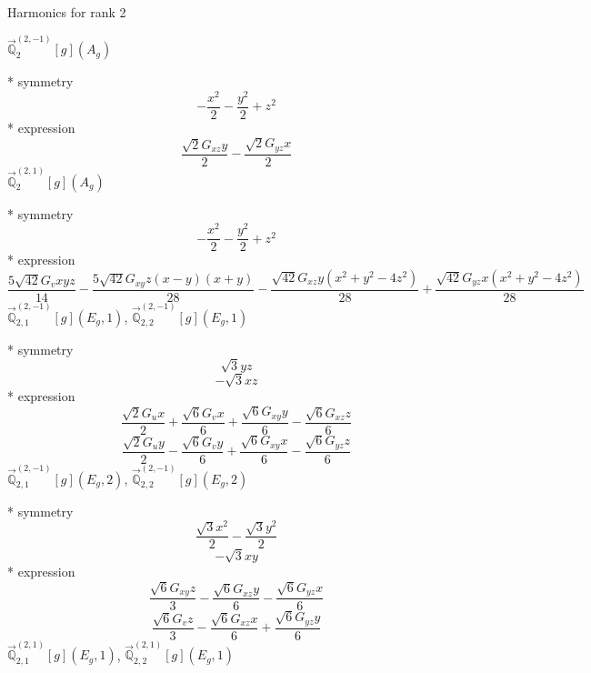 \documentclass[fleqn,8pt]{jsarticle}
\begin{document}
\noindent * Harmonics for rank 2

\noindent\quad $\vec{\mathbb{Q}}_{2}^{(2,-1)}[g](A_{g})$

\noindent\quad ** symmetry
\begin{dmath*}
- \frac{x^{2}}{2} - \frac{y^{2}}{2} + z^{2}
\end{dmath*}
\noindent\quad ** expression
\begin{dmath*}
\frac{\sqrt{2} G_{xz} y}{2} - \frac{\sqrt{2} G_{yz} x}{2}
\end{dmath*}
\noindent\quad $\vec{\mathbb{Q}}_{2}^{(2,1)}[g](A_{g})$

\noindent\quad ** symmetry
\begin{dmath*}
- \frac{x^{2}}{2} - \frac{y^{2}}{2} + z^{2}
\end{dmath*}
\noindent\quad ** expression
\begin{dmath*}
\frac{5 \sqrt{42} G_{v} x y z}{14} - \frac{5 \sqrt{42} G_{xy} z \left(x - y\right) \left(x + y\right)}{28} - \frac{\sqrt{42} G_{xz} y \left(x^{2} + y^{2} - 4 z^{2}\right)}{28} + \frac{\sqrt{42} G_{yz} x \left(x^{2} + y^{2} - 4 z^{2}\right)}{28}
\end{dmath*}
\noindent\quad $\vec{\mathbb{Q}}_{2,1}^{(2,-1)}[g](E_{g},1)$, $\vec{\mathbb{Q}}_{2,2}^{(2,-1)}[g](E_{g},1)$

\noindent\quad ** symmetry
\begin{dmath*}
\sqrt{3} y z
\end{dmath*}
\begin{dmath*}
- \sqrt{3} x z
\end{dmath*}
\noindent\quad ** expression
\begin{dmath*}
\frac{\sqrt{2} G_{u} x}{2} + \frac{\sqrt{6} G_{v} x}{6} + \frac{\sqrt{6} G_{xy} y}{6} - \frac{\sqrt{6} G_{xz} z}{6}
\end{dmath*}
\begin{dmath*}
\frac{\sqrt{2} G_{u} y}{2} - \frac{\sqrt{6} G_{v} y}{6} + \frac{\sqrt{6} G_{xy} x}{6} - \frac{\sqrt{6} G_{yz} z}{6}
\end{dmath*}
\noindent\quad $\vec{\mathbb{Q}}_{2,1}^{(2,-1)}[g](E_{g},2)$, $\vec{\mathbb{Q}}_{2,2}^{(2,-1)}[g](E_{g},2)$

\noindent\quad ** symmetry
\begin{dmath*}
\frac{\sqrt{3} x^{2}}{2} - \frac{\sqrt{3} y^{2}}{2}
\end{dmath*}
\begin{dmath*}
- \sqrt{3} x y
\end{dmath*}
\noindent\quad ** expression
\begin{dmath*}
\frac{\sqrt{6} G_{xy} z}{3} - \frac{\sqrt{6} G_{xz} y}{6} - \frac{\sqrt{6} G_{yz} x}{6}
\end{dmath*}
\begin{dmath*}
\frac{\sqrt{6} G_{v} z}{3} - \frac{\sqrt{6} G_{xz} x}{6} + \frac{\sqrt{6} G_{yz} y}{6}
\end{dmath*}
\noindent\quad $\vec{\mathbb{Q}}_{2,1}^{(2,1)}[g](E_{g},1)$, $\vec{\mathbb{Q}}_{2,2}^{(2,1)}[g](E_{g},1)$
\end{document}
